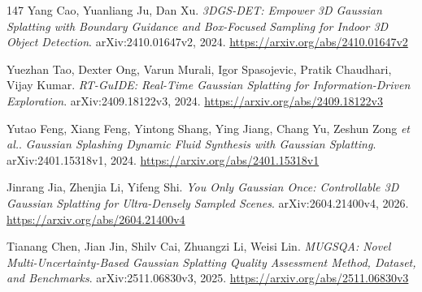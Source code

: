 \documentclass[11pt,a4paper]{article}
\begin{document}
\begin{thebibliography}{147}
Yang Cao, Yuanliang Ju, Dan Xu.
\newblock \emph{3DGS-DET: Empower 3D Gaussian Splatting with Boundary Guidance and Box-Focused Sampling for Indoor 3D Object Detection}.
\newblock arXiv:2410.01647v2, 2024.
\newblock \url{https://arxiv.org/abs/2410.01647v2}

Yuezhan Tao, Dexter Ong, Varun Murali, Igor Spasojevic, Pratik Chaudhari, Vijay Kumar.
\newblock \emph{RT-GuIDE: Real-Time Gaussian Splatting for Information-Driven Exploration}.
\newblock arXiv:2409.18122v3, 2024.
\newblock \url{https://arxiv.org/abs/2409.18122v3}

Yutao Feng, Xiang Feng, Yintong Shang, Ying Jiang, Chang Yu, Zeshun Zong \emph{et al.}.
\newblock \emph{Gaussian Splashing Dynamic Fluid Synthesis with Gaussian Splatting}.
\newblock arXiv:2401.15318v1, 2024.
\newblock \url{https://arxiv.org/abs/2401.15318v1}

Jinrang Jia, Zhenjia Li, Yifeng Shi.
\newblock \emph{You Only Gaussian Once: Controllable 3D Gaussian Splatting for Ultra-Densely Sampled Scenes}.
\newblock arXiv:2604.21400v4, 2026.
\newblock \url{https://arxiv.org/abs/2604.21400v4}

Tianang Chen, Jian Jin, Shilv Cai, Zhuangzi Li, Weisi Lin.
\newblock \emph{MUGSQA: Novel Multi-Uncertainty-Based Gaussian Splatting Quality Assessment Method, Dataset, and Benchmarks}.
\newblock arXiv:2511.06830v3, 2025.
\newblock \url{https://arxiv.org/abs/2511.06830v3}

\end{thebibliography}
\end{document}
